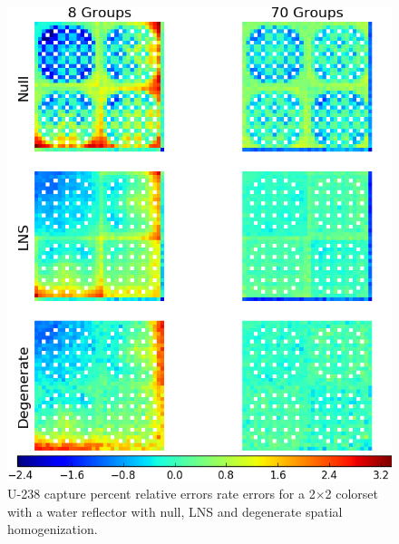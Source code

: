\begin{figure}[h!]
\centering
\includegraphics[width=\linewidth]{figures/patterns/lns/reflector/capt-err}
\vspace{2mm}
\caption[U-238 capture rate errors for a 2$\times$2 colorset with a reflector]{U-238 capture percent relative errors rate errors for a 2$\times$2 colorset with a water reflector with null, \ac{LNS} and degenerate spatial homogenization.}
\label{fig:chap9-reflector-lns-capt-err}
\end{figure}

\clearpage

